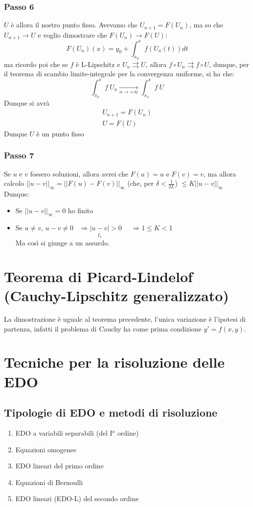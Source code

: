 \documentclass{article}
\theoremstyle{definition}
\begin{document}
\subsubsection{Passo 6}
$U$ è allora il nostro punto fisso. Avevamo che $U_{n+1}=F(U_n)$, ma so che $U_{n+1} \to U$ e voglio dimostrare che $F(U_n) \to F(U)$:
\begin{equation}
    F(U_n)(x)=y_0 + \int_{x_0}^x f(U_n(t))dt
\end{equation}
ma ricordo poi che se $f$ è L-Lipschitz e $U_n \rightrightarrows U$, allora $f \circ U_n \rightrightarrows f \circ U$, dunque, per il teorema di scambio limite-integrale per la convergenza uniforme, si ha che:
\begin{equation}
    \int_{x_0}^x f \ U_n \underset{n \to +\infty}{\rightarrow} \int_{x_0}^x f \ U
\end{equation}
Dunque si avrà 
\begin{align*}
    U_{n+1}=F(U_n) \\
    U = F(U)
\end{align*}
Dunque $U$ è un punto fisso
\subsubsection{Passo 7}
Se $u$ e $v$ fossero soluzioni, allora avrei che $F(u)=u$ e $F(v)=v$, ma allora calcolo $||u-v||_\infty = ||F(u)-F(v)||_\infty$ (che, per $\delta < \frac{1}{2L}$) $\leqslant K||u-v||_\infty$
\\
Dunque:
\begin{itemize}
    \item Se $||u-v||_\infty =0$ ho finito 
    \item Se $u \neq v$, $u-v \neq 0 \,\,\,\,\, \Longrightarrow \underset{I_\delta}{|u-v|} > 0 \,\,\,\,\,\,\,\, \Longrightarrow 1 \leqslant K < 1$
\\
Ma così si giunge a un assurdo.
\end{itemize}
\section{Teorema di Picard-Lindelof (Cauchy-Lipschitz generalizzato)}
La dimostrazione è uguale al teorema precedente, l'unica variazione è l'ipotesi di partenza, infatti il problema di Cauchy ha come prima condizione $y'=f(x,y)$.
\section{Tecniche per la risoluzione delle EDO}
\subsection{Tipologie di EDO e metodi di risoluzione}
\begin{enumerate}
    \item EDO a variabili separabili (del I$^o$ ordine)
    \item Equazioni omogenee
    \item EDO lineari del primo ordine
    \item Equazioni di Bernoulli
    \item EDO lineari (EDO-L) del secondo ordine
\end{enumerate}
\end{document}
